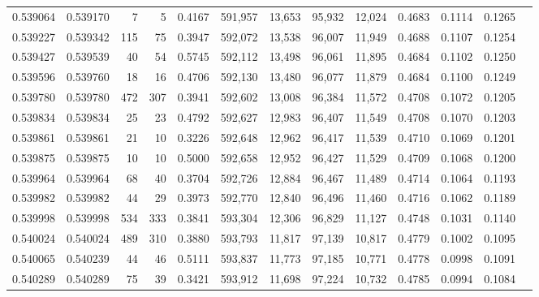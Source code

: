\begin{tabular}{rrrrrrrrrrrrr}
0.539064 & 0.539170 &     7 &     5 &                                     0.4167 & 591,957 &  13,653 &  95,932 &  12,024 & 0.4683 & 0.1114 & 0.1265 \\
0.539227 & 0.539342 &   115 &    75 &                                     0.3947 & 592,072 &  13,538 &  96,007 &  11,949 & 0.4688 & 0.1107 & 0.1254 \\
0.539427 & 0.539539 &    40 &    54 &                                     0.5745 & 592,112 &  13,498 &  96,061 &  11,895 & 0.4684 & 0.1102 & 0.1250 \\
0.539596 & 0.539760 &    18 &    16 &                                     0.4706 & 592,130 &  13,480 &  96,077 &  11,879 & 0.4684 & 0.1100 & 0.1249 \\
0.539780 & 0.539780 &   472 &   307 &                                     0.3941 & 592,602 &  13,008 &  96,384 &  11,572 & 0.4708 & 0.1072 & 0.1205 \\
0.539834 & 0.539834 &    25 &    23 &                                     0.4792 & 592,627 &  12,983 &  96,407 &  11,549 & 0.4708 & 0.1070 & 0.1203 \\
0.539861 & 0.539861 &    21 &    10 &                                     0.3226 & 592,648 &  12,962 &  96,417 &  11,539 & 0.4710 & 0.1069 & 0.1201 \\
0.539875 & 0.539875 &    10 &    10 &                                     0.5000 & 592,658 &  12,952 &  96,427 &  11,529 & 0.4709 & 0.1068 & 0.1200 \\
0.539964 & 0.539964 &    68 &    40 &                                     0.3704 & 592,726 &  12,884 &  96,467 &  11,489 & 0.4714 & 0.1064 & 0.1193 \\
0.539982 & 0.539982 &    44 &    29 &                                     0.3973 & 592,770 &  12,840 &  96,496 &  11,460 & 0.4716 & 0.1062 & 0.1189 \\
0.539998 & 0.539998 &   534 &   333 &                                     0.3841 & 593,304 &  12,306 &  96,829 &  11,127 & 0.4748 & 0.1031 & 0.1140 \\
0.540024 & 0.540024 &   489 &   310 &                                     0.3880 & 593,793 &  11,817 &  97,139 &  10,817 & 0.4779 & 0.1002 & 0.1095 \\
0.540065 & 0.540239 &    44 &    46 &                                     0.5111 & 593,837 &  11,773 &  97,185 &  10,771 & 0.4778 & 0.0998 & 0.1091 \\
0.540289 & 0.540289 &    75 &    39 &                                     0.3421 & 593,912 &  11,698 &  97,224 &  10,732 & 0.4785 & 0.0994 & 0.1084 \\

\end{tabular}
